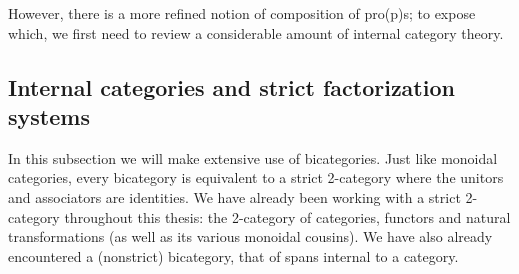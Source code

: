 However, there is a more refined notion of composition of pro(p)s; to expose which, we first need to review  a considerable amount of internal category theory.
\subsection{Internal categories and strict factorization systems}
In this subsection we will make extensive use of bicategories.  Just like monoidal categories, every bicategory is equivalent to a strict 2-category where the unitors and associators are identities.  We have already been working with a strict 2-category throughout this thesis: the 2-category of categories, functors and natural transformations (as well as its various monoidal cousins).   We have also already encountered a (nonstrict) bicategory, that of spans internal to a category.  

